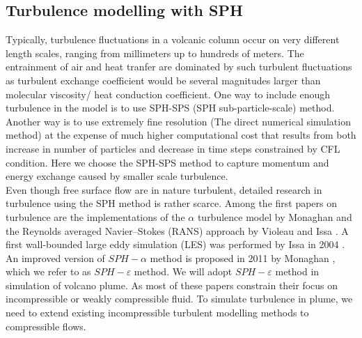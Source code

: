 \documentclass[10pt,a4paper]{article}
\begin{document}
\subsection{Turbulence modelling with SPH}
Typically, turbulence fluctuations in a volcanic column occur on very different length scales, ranging from millimeters up to hundreds of meters. The entrainment of air and heat tranfer are dominated by such turbulent fluctuations as turbulent exchange coefficient would be several magnitudes larger than molecular viscosity/ heat conduction coefficient. One way to include enough turbulence in the model is to use SPH-SPS (SPH sub-particle-scale) method.
Another way is to use extremely fine resolution (The direct numerical simulation method) at the expense of much higher computational cost that results from both increase in number of particles and decrease in time steps constrained by CFL condition. Here we choose the SPH-SPS method to capture  momentum and energy exchange caused by smaller scale turbulence.\\
Even though free surface flow are in nature turbulent, detailed research in turbulence using the SPH method is rather scarce. Among the first papers on turbulence are the implementations of the $\alpha$ turbulence model \cite{holm1999fluctuation} by Monaghan \cite{monaghan2002sph} and the Reynolds averaged Navier–Stokes (RANS) approach by Violeau and Issa \cite{violeau2007numerical}. A first wall-bounded large eddy simulation (LES) was performed by Issa in 2004 \citep{issa2005numerical}. An improved version of $SPH-\alpha$ method is proposed in 2011 by Monaghan \cite{monaghan2011turbulence}, which we refer to as $SPH-\varepsilon$ method. We will adopt $SPH-\varepsilon$ method in simulation of volcano plume. As most of these papers constrain their focus on incompressible or weakly compressible fluid. To simulate turbulence in plume, we need to extend existing incompressible turbulent modelling methods to compressible flows.\\
\end{document}
